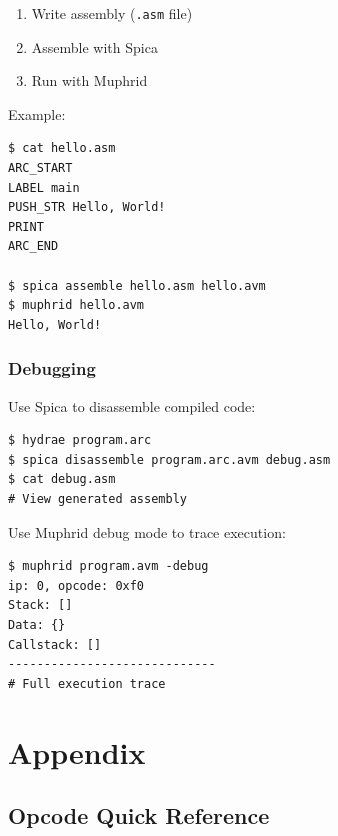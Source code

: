 \documentclass[11pt,a4paper]{article}
\begin{document}
\begin{enumerate}
    \item Write assembly (\texttt{.asm} file)
    \item Assemble with Spica
    \item Run with Muphrid
\end{enumerate}

Example:
\begin{verbatim}
$ cat hello.asm
ARC_START
LABEL main
PUSH_STR Hello, World!
PRINT
ARC_END

$ spica assemble hello.asm hello.avm
$ muphrid hello.avm
Hello, World!
\end{verbatim}

\subsubsection{Debugging}

Use Spica to disassemble compiled code:
\begin{verbatim}
$ hydrae program.arc
$ spica disassemble program.arc.avm debug.asm
$ cat debug.asm
# View generated assembly
\end{verbatim}

Use Muphrid debug mode to trace execution:
\begin{verbatim}
$ muphrid program.avm -debug
ip: 0, opcode: 0xf0
Stack: []
Data: {}
Callstack: []
-----------------------------
# Full execution trace
\end{verbatim}

\newpage
\section{Appendix}

\subsection{Opcode Quick Reference}
\end{document}
